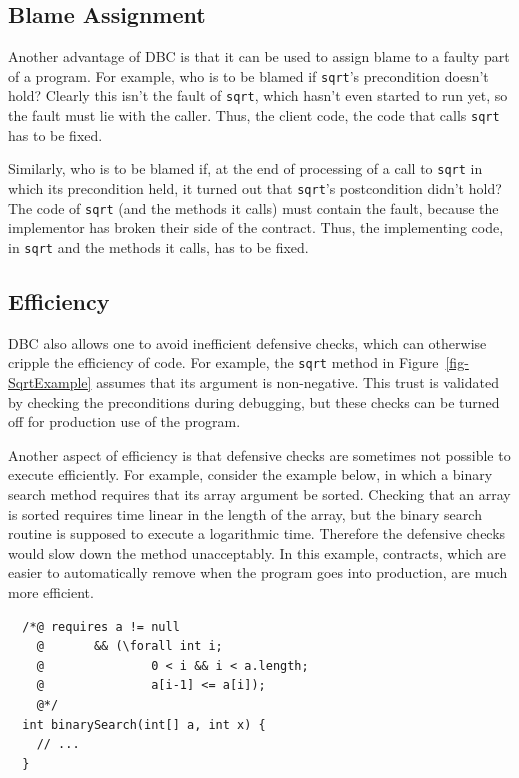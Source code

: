 \documentclass[twocolumn]{article}
\begin{document}
\subsection{Blame Assignment}

Another advantage of DBC is that it can be used to assign
blame to a faulty part of a program.  For example, who is to be
blamed if \texttt{sqrt}'s precondition doesn't hold?  Clearly this
isn't the fault of \texttt{sqrt}, which hasn't even started to run
yet, so the fault must lie with the caller.
Thus, the client code, the code that calls \texttt{sqrt} has to be fixed.

Similarly, who is to be blamed if, at the end of processing of a
call to \texttt{sqrt} in which its precondition held,
it turned out that \texttt{sqrt}'s postcondition didn't hold?
The code of \texttt{sqrt} (and the methods it calls)
must contain the fault, because the implementor has broken
their side of the contract. Thus, the implementing code, in
\texttt{sqrt} and the methods it calls, has to be fixed.

\subsection{Efficiency}

DBC also allows one to avoid inefficient defensive checks, which can
otherwise cripple the efficiency of code.
For example, the \texttt{sqrt} method in
Figure~\ref{fig-SqrtExample} assumes that its argument is
non-negative.  This trust is validated by checking the
preconditions during debugging, but these checks can be turned off for
production use of the program.

Another aspect of efficiency is that defensive checks are sometimes
not possible to execute efficiently.  For example, consider the
example below, in which a binary search method requires that its array
argument be sorted.  Checking that an array is sorted requires time
linear in the length of the array, but the binary search routine is
supposed to execute a logarithmic time.  Therefore the defensive
checks would slow down the method unacceptably.  In this example,
contracts, which are easier to automatically remove when the program
goes into production, are much more efficient.

\begin{verbatim}
  /*@ requires a != null 
    @       && (\forall int i;
    @               0 < i && i < a.length;
    @               a[i-1] <= a[i]);
    @*/
  int binarySearch(int[] a, int x) {
    // ... 
  }
\end{verbatim}
\end{document}
